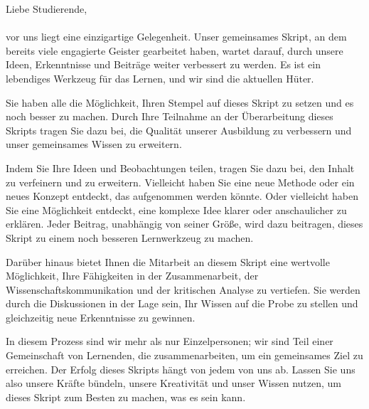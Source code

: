 \documentclass[a4paper]{article}
\begin{document}
Liebe Studierende,\\\\ vor uns liegt eine einzigartige Gelegenheit. Unser gemeinsames Skript, an dem bereits viele engagierte Geister gearbeitet haben, wartet darauf, durch unsere Ideen, Erkenntnisse und Beiträge weiter verbessert zu werden. Es ist ein lebendiges Werkzeug für das Lernen, und wir sind die aktuellen Hüter.

Sie haben alle die Möglichkeit, Ihren Stempel auf dieses Skript zu setzen und es noch besser zu machen. Durch Ihre Teilnahme an der Überarbeitung dieses Skripts tragen Sie dazu bei, die Qualität unserer Ausbildung zu verbessern und unser gemeinsames Wissen zu erweitern.

Indem Sie Ihre Ideen und Beobachtungen teilen, tragen Sie dazu bei, den Inhalt zu verfeinern und zu erweitern. Vielleicht haben Sie eine neue Methode oder ein neues Konzept entdeckt, das aufgenommen werden könnte. Oder vielleicht haben Sie eine Möglichkeit entdeckt, eine komplexe Idee klarer oder anschaulicher zu erklären. Jeder Beitrag, unabhängig von seiner Größe, wird dazu beitragen, dieses Skript zu einem noch besseren Lernwerkzeug zu machen.

Darüber hinaus bietet Ihnen die Mitarbeit an diesem Skript eine wertvolle Möglichkeit, Ihre Fähigkeiten in der Zusammenarbeit, der Wissenschaftskommunikation und der kritischen Analyse zu vertiefen. Sie werden durch die Diskussionen in der Lage sein, Ihr Wissen auf die Probe zu stellen und gleichzeitig neue Erkenntnisse zu gewinnen.

In diesem Prozess sind wir mehr als nur Einzelpersonen; wir sind Teil einer Gemeinschaft von Lernenden, die zusammenarbeiten, um ein gemeinsames Ziel zu erreichen. Der Erfolg dieses Skripts hängt von jedem von uns ab. Lassen Sie uns also unsere Kräfte bündeln, unsere Kreativität und unser Wissen nutzen, um dieses Skript zum Besten zu machen, was es sein kann.
\end{document}
